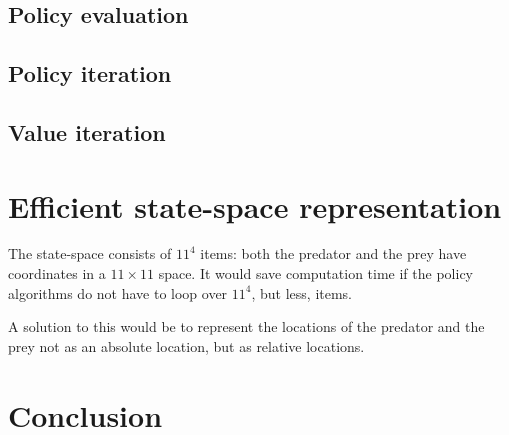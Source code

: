 \documentclass{article}
\begin{document}
\subsection{Policy evaluation}

\subsection{Policy iteration}

\subsection{Value iteration}

\section{Efficient state-space representation}
The state-space consists of $11^4$ items: both the predator and the prey have coordinates in a $11 \times 11$ space. It would save computation time if the policy algorithms do not have to loop over $11^4$, but less, items.

A solution to this would be to represent the locations of the predator and the prey not as an absolute location, but as relative locations.

\section{Conclusion}
\end{document}
